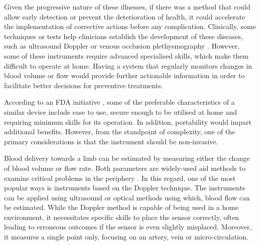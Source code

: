 Given the progressive nature of these illnesses, if there was a method that could allow early detection or prevent the deterioration of health, it could accelerate the implementation of corrective actions before any complication. Clinically, some techniques or tests help clinicians establish the development of these diseases, such as ultrasound Doppler \cite{casey2008measuring} or venous occlusion plethysmography \cite{wilkinson2001venous}. However, some of these instruments require advanced specialised skills, which make them difficult to operate at home. Having a system that regularly monitors changes in blood volume or flow would provide further actionable information in order to facilitate better decisions for preventive treatments. 

According to an FDA initiative \cite{fdaini}, some of the preferable characteristics of a similar device include ease to use, secure enough to be utilised at home and requiring minimum skills for its operation. In addition, portability would impart additional benefits. However, from the standpoint of complexity, one of the primary considerations is that the instrument should be non-invasive. 

Blood delivery towards a limb can be estimated by measuring either the change of blood volume or flow rate. Both parameters are widely-used aid methods to examine critical problems in the periphery \cite{orchard1993assessment, hirsch2001peripheral}. In this regard, one of the most popular ways is instruments based on the Doppler technique. The instruments can be applied using ultrasound \cite{orekhova2013doppler} or optical \cite{fredriksson2007laser} methods using which, blood flow can be estimated. While the Doppler method is capable of being used in a home environment, it necessitates specific skills to place the sensor correctly, often leading to erroneous outcomes if the sensor is even slightly misplaced. Moreover, it measures a single point only, focusing on an artery, vein or micro-circulation. 


